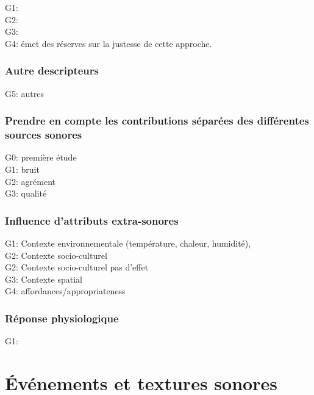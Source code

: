 G1: \citep{davies2013perception}\\
G2: \citep{cain2013development}\\
G3: \citep{axelsson2010principal}\\
G4: \citep{hall2013exploratory} émet des réserves sur la justesse de cette approche.

\subsubsection{Autre descripteurs}

G5: \citep{kang2010semantic} autres

\subsubsection{Prendre en compte les contributions séparées des différentes sources sonores}

G0: \citep{defreville2004aactivity} première étude\\
G1: \citep{marquis2015simulated} bruit\\
G2:  \citep{lavandier2006contribution,guillen2007importance} agrément\\
G3:  \citep{nilsson2007soundscape,ricciardi2015sound} qualité

\subsubsection{Influence d'attributs extra-sonores}

G1: Contexte environnementale (température, chaleur, humidité), \citep{meng2013field,jeon2011non} \\
G2: Contexte socio-culturel \citep{hall2013exploratory,yu2010factors}\\
G2: Contexte socio-culturel \citep{guillen2007importance} pas d'effet\\
G3: Contexte spatial \citep{hall2013exploratory}\\
G4: affordances/appropriateness \citep{hall2013exploratory}

\subsubsection{Réponse physiologique}

G1: \citep{hume2013physiological}

\section{Événements et textures sonores}
\label{sec:ch3_eventTexture}

